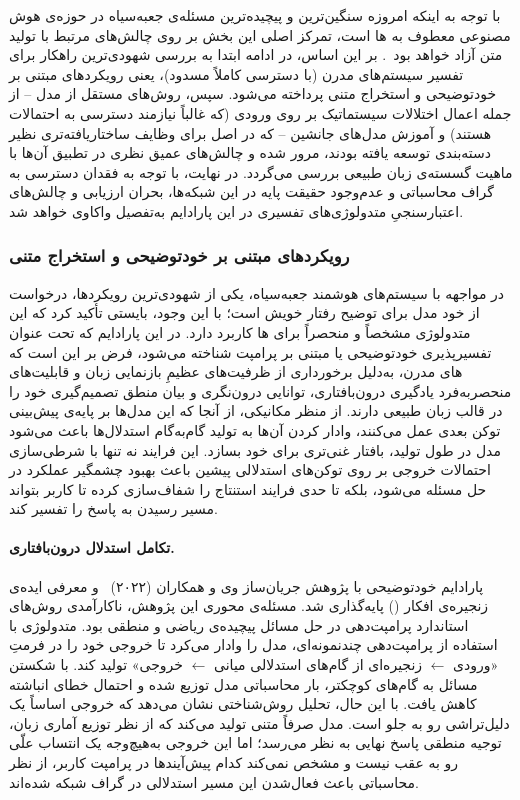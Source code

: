 با توجه به اینکه امروزه سنگین‌ترین و پیچیده‌ترین مسئله‌ی جعبه‌سیاه در حوزه‌ی هوش مصنوعی معطوف به ها است، تمرکز اصلی این بخش بر روی چالش‌های مرتبط با تولید متن آزاد خواهد بود~\cite{schneider2024explainable, danilevsky2020survey}. بر این اساس، در ادامه ابتدا به بررسی شهودی‌ترین راهکار برای تفسیر سیستم‌های مدرن (با دسترسی کاملاً مسدود)، یعنی رویکردهای مبتنی بر خودتوضیحی و استخراج متنی پرداخته می‌شود. سپس، روش‌های مستقل از مدل – از جمله اعمال اختلالات سیستماتیک بر روی ورودی (که غالباً نیازمند دسترسی به احتمالات هستند) و آموزش مدل‌های جانشین – که در اصل برای وظایف ساختاریافته‌تری نظیر دسته‌بندی توسعه یافته بودند، مرور شده و چالش‌های عمیق نظری در تطبیق آن‌ها با ماهیت گسسته‌ی زبان طبیعی بررسی می‌گردد. در نهایت، با توجه به فقدان دسترسی به گراف محاسباتی و عدم‌وجود حقیقت پایه در این شبکه‌ها، بحران ارزیابی و چالش‌های اعتبارسنجیِ متدولوژی‌های تفسیری در این پارادایم به‌تفصیل واکاوی خواهد شد.


\subsubsection{رویکردهای مبتنی بر خودتوضیحی و استخراج متنی}\label{sec:3-1-3-1}

در مواجهه با سیستم‌های هوشمند جعبه‌سیاه، یکی از شهودی‌ترین رویکردها، درخواست از خود مدل برای توضیح رفتار خویش است؛ با این وجود، بایستی تأکید کرد که این متدولوژی مشخصاً و منحصراً برای ها کاربرد دارد. در این پارادایم که تحت عنوان تفسیرپذیری خودتوضیحی یا مبتنی بر پرامپت شناخته می‌شود، فرض بر این است که های مدرن، به‌دلیل برخورداری از ظرفیت‌های عظیمِ بازنمایی زبان و قابلیت‌های منحصربه‌فرد یادگیری درون‌بافتاری، توانایی درون‌نگری و بیان منطق تصمیم‌گیری خود را در قالب زبان طبیعی دارند. از منظر مکانیکی، از آنجا که این مدل‌ها بر پایه‌ی پیش‌بینی توکن بعدی عمل می‌کنند، وادار کردن آن‌ها به تولید گام‌به‌گام استدلال‌ها باعث می‌شود مدل در طول تولید، بافتار غنی‌تری برای خود بسازد. این فرایند نه تنها با شرطی‌سازی احتمالات خروجی بر روی توکن‌های استدلالی پیشین باعث بهبود چشمگیر عملکرد در حل مسئله می‌شود، بلکه تا حدی فرایند استنتاج را شفاف‌سازی کرده تا کاربر بتواند مسیر رسیدن به پاسخ را تفسیر کند. 

\paragraph{تکامل استدلال درون‌بافتاری.}

پارادایم خودتوضیحی با پژوهش جریان‌ساز وی و همکاران (۲۰۲۲)~\cite{wei2022chain} و معرفی ایده‌ی زنجیره‌ی افکار () پایه‌گذاری شد. مسئله‌ی محوری این پژوهش، ناکارآمدی روش‌های استاندارد پرامپت‌دهی در حل مسائل پیچیده‌ی ریاضی و منطقی بود. متدولوژی  با استفاده از پرامپت‌دهی چندنمونه‌ای، مدل را وادار می‌کرد تا خروجی خود را در فرمتِ «ورودی $\leftarrow$ زنجیره‌ای از گام‌های استدلالی میانی $\leftarrow$ خروجی» تولید کند. با شکستن مسائل به گام‌های کوچکتر، بار محاسباتی مدل توزیع شده و احتمال خطای انباشته کاهش یافت. با این حال، تحلیل روش‌شناختی نشان می‌دهد که خروجی  اساساً یک دلیل‌تراشی رو به جلو است. مدل صرفاً متنی تولید می‌کند که از نظر توزیع آماری زبان، توجیه منطقی پاسخ نهایی به نظر می‌رسد؛ اما این خروجی به‌هیچ‌وجه یک انتساب علّی رو به عقب نیست و مشخص نمی‌کند کدام پیش‌آیندها در پرامپت کاربر، از نظر محاسباتی باعث فعال‌شدن این مسیر استدلالی در گراف شبکه شده‌اند.

